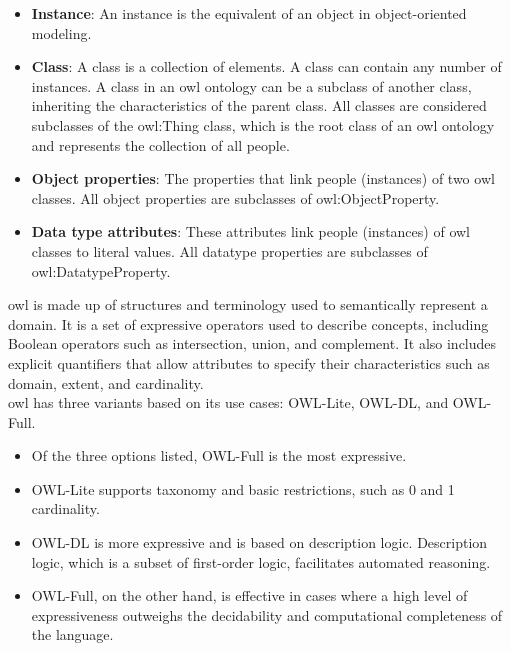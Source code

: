             \begin{itemize}
                \item \textbf{Instance}: An instance is the equivalent of an object in object-oriented modeling. 
                \item \textbf{Class}: A class is a collection of elements. A class can contain any number of instances. A class in an \acrshort{owl} ontology can be a subclass of another class, inheriting the characteristics of the parent class. All classes are considered subclasses of the owl:Thing class, which is the root class of an \acrshort{owl} ontology and represents the collection of all people. 
                \item \textbf{Object properties}: The properties that link people (instances) of two \acrshort{owl} classes. All object properties are subclasses of owl:ObjectProperty. 
                \item \textbf{Data type attributes}: These attributes link people (instances) of \acrshort{owl} classes to literal values. All datatype properties are subclasses of owl:DatatypeProperty.
            \end{itemize}
        
            \acrshort{owl} is made up of structures and terminology used to semantically represent a domain. It is a set of expressive operators used to describe concepts, including Boolean operators such as intersection, union, and complement. It also includes explicit quantifiers that allow attributes to specify their characteristics such as domain, extent, and cardinality.\\
        
            \acrshort{owl} has three variants based on its use cases: OWL-Lite, OWL-DL, and OWL-Full. 
        
            \begin{itemize}
                \item Of the three options listed, OWL-Full is the most expressive. 
                \item OWL-Lite supports taxonomy and basic restrictions, such as 0 and 1 cardinality. 
                \item OWL-DL is more expressive and is based on description logic. Description logic, which is a subset of first-order logic, facilitates automated reasoning. 
                \item OWL-Full, on the other hand, is effective in cases where a high level of expressiveness outweighs the decidability and computational completeness of the language.
            \end{itemize}

